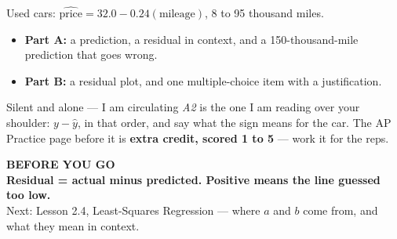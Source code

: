 \documentclass[aspectratio=169, 11pt]{beamer}
\begin{document}
\begin{frame}[t, plain]
  Used cars: $\widehat{\text{price}} = 32.0 - 0.24(\text{mileage})$, 8 to 95 thousand miles.
  \begin{itemize}\setlength{\itemsep}{5pt}
    \item \textbf{Part A:} a prediction, a residual in context, and a 150-thousand-mile
          prediction that goes wrong.
    \item \textbf{Part B:} a residual plot, and one multiple-choice item with a justification.
  \end{itemize}
  \begin{block}{Silent and alone --- I am circulating}
    \emph{A2} is the one I am reading over your shoulder: $y - \hat{y}$, in that order, and
    say what the sign means for the car. The AP Practice page before it is \textbf{extra credit,
    scored 1 to 5} --- work it for the reps.
  \end{block}
\end{frame}

{
\begin{frame}[plain]
  \vspace{1.5cm}\hspace{0.8cm}%
  \begin{minipage}{0.86\textwidth}
    {\color{goldacc}\bfseries\small BEFORE YOU GO}\\[0.7cm]
    {\color{white}\bfseries\Large Residual = actual minus predicted. Positive means the
    line guessed too low.}\\[0.9cm]
    {\color{skymid}\small Next: Lesson 2.4, Least-Squares Regression --- where $a$ and $b$
    come from, and what they mean in context.}
  \end{minipage}
\end{frame}
}
\end{document}
